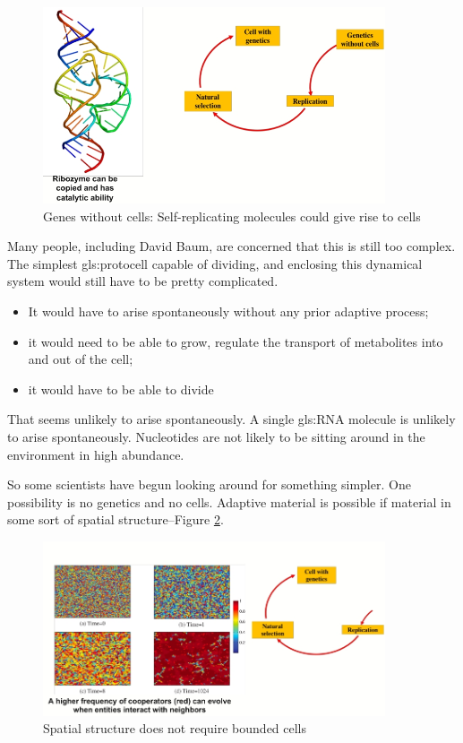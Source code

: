 \documentclass[]{article}
\begin{document}
\begin{figure}[H]
	\caption[Genes without cells]{Genes without cells: Self-replicating molecules could give rise to cells}\label{fig:GenesWithoutCells}
	\includegraphics[width=0.9\textwidth]{GenesWithoutCells}
\end{figure}

Many people, including David Baum, are concerned that this is still too complex. The simplest \gls{gls:protocell} capable of dividing, and enclosing this dynamical system would still have to be pretty complicated.
\begin{itemize}
	\item It would have to arise spontaneously without any prior adaptive process;
	\item it would need to be able to grow, regulate the transport of metabolites into and out of the cell;
	\item it would have to be able to divide
\end{itemize}
 That seems unlikely to arise spontaneously. A single \gls{gls:RNA} molecule is unlikely to arise spontaneously. Nucleotides are not likely to be sitting around in the environment in high abundance.

So some scientists have begun looking around for something simpler. 
One possibility is no genetics and no cells. Adaptive material is possible if material in some sort of spatial structure--Figure \ref{fig:WangWang}.

\begin{figure}[H]
	\caption[Spatial structure does not require bounded cells]{Spatial structure does not require bounded cells\cite{wang2015evolution}}\label{fig:WangWang}
	\includegraphics[width=0.9\textwidth]{WangWang}
\end{figure}
\end{document}
